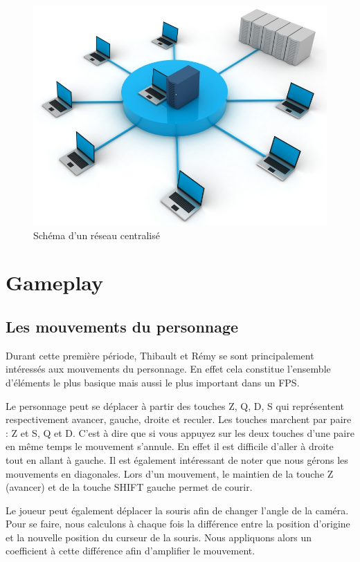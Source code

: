 \documentclass[11pt]{report}
\begin{document}
\begin{figure}[htbp]
\centering
\includegraphics[scale=0.4]{reseau.jpg}
\caption{Schéma d'un réseau centralisé}
\end{figure}

\newpage
\section{Gameplay}

\subsection{Les mouvements du personnage}

Durant cette première période, Thibault et Rémy se sont principalement intéressés aux mouvements du personnage. En effet cela constitue l'ensemble d'éléments le plus basique mais aussi le plus important dans un FPS.

Le personnage peut se déplacer à partir des touches Z, Q, D, S qui représentent respectivement avancer, gauche, droite et reculer. Les touches marchent par paire : Z et S, Q et D. C'est à dire que si vous appuyez sur les deux touches d'une paire en même temps le mouvement s'annule. En effet il est difficile d'aller à droite tout en allant à gauche. Il est également intéressant de noter que nous gérons les mouvements en diagonales. Lors d'un mouvement, le maintien de la touche Z (avancer) et de la touche SHIFT gauche permet de courir.

Le joueur peut également déplacer la souris afin de changer l'angle de la caméra. Pour se faire, nous calculons à chaque fois la différence entre la position d'origine et la nouvelle position du curseur de la souris. Nous appliquons alors un coefficient à cette différence afin d'amplifier le mouvement.
\end{document}
